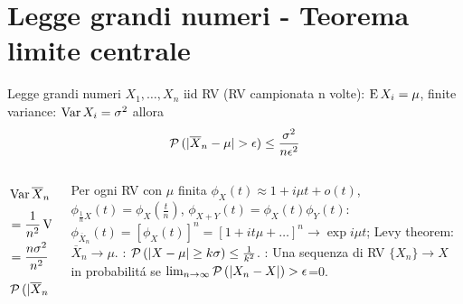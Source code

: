 \section{Legge grandi numeri - Teorema limite centrale}

\begin{frame}{Legge grandi numeri}
$X_1,\ldots,X_n$ iid RV (RV campionata n volte): $\operatorname{E}{X_i}=\mu$, finite variance: $\operatorname{Var}{X_i}=\sigma^2$ allora \[\prob{(|\overline{X}_n-\mu|>\epsilon)}\leq\frac{\sigma^2}{n\epsilon^2}\]
    \begin{columns}
    \begin{column}{0.4\textwidth}
\begin{align*}
&\var{\overline{X}_n}=\var{\frac{1}{n}(X_1+\ldots+X_n)}\\
&=\frac{1}{n^2}\var{(X_1+\ldots+X_n)}\\
&=\frac{n\sigma^2}{n^2}=\frac{\sigma^2}{n}\\
&\prob{(|\overline{X}_n-\mu|>\epsilon)}\leq\frac{\sigma^2}{n\epsilon^2}
\end{align*}
    \end{column}
    \begin{column}{0.6\textwidth}
Per ogni RV con $\mu$ finita $\phi_X(t)\approx1+i\mu t+o(t)$,$\phi_{\frac{1}{n}X}(t)=\phi_X(\frac{t}{n})$, $\phi_{X+Y}(t)=\phi_X(t)\phi_Y(t)$:
$\phi_{\overline{X}_n}(t)=[\phi_X(t)]^n=[1+it\mu+\ldots]^n\to\exp{i\mu t}$; Levy theorem: $\overline{X}_n\to\mu$.
: $\operatorname{\mathcal{P}}{(|X-\mu|\geq k\sigma)}\leq\frac{1}{k^2}$.
: Una sequenza di RV $\{X_n\}\to X$ in probabilit\'a se $\lim_{n\to\infty}\operatorname{\mathcal{P}}{(|X_n-X|)>\epsilon}$=0.
    \end{column}
    \end{columns}
\end{frame}

